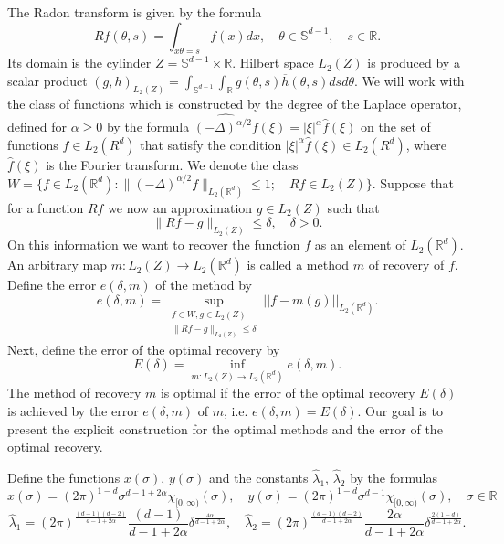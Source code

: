 \documentclass[12pt]{iopart}
\begin{document}
The Radon transform is given by the formula
	$$Rf(\theta,s)=\int_{x\theta=s}f(x)dx,\quad \theta\in\mathbb S^{d-1},\quad s\in\mathbb R.$$
Its domain is the cylinder $Z=\mathbb S^{d-1}\times\mathbb R.$ Hilbert space $L_2(Z)$ is produced by a scalar product	
	$(g,h)_{L_2(Z)}=\int_{\mathbb S^{d-1}}\int_{\mathbb R}g(\theta,s)\overline h(\theta,s)dsd\theta.$
We will work with the class of functions which is constructed by the degree of the Laplace operator, defined for $\alpha\ge 0$ by the formula $\widehat{(-\Delta)^{\alpha/2}f}(\xi)=|\xi|^\alpha \widehat f(\xi)$ on the set of functions $f\in L_2(R^d)$ that satisfy the condition $|\xi|^\alpha\widehat f(\xi)\in L_2(R^d)$, where $\widehat f(\xi)$ is the Fourier transform. We denote the class $ W=\{f\in L_2(\mathbb R^d) :
\|(-\Delta)^{\alpha/2}f\|_{L_2(\mathbb R^d)}\leqslant  1;\quad Rf\in L_2(Z) \}.  $
Suppose that for a function $Rf$ we now an approximation $g\in L_2(Z)$ such that
	$$\|Rf-g\|_{L_2(Z)}\le\delta, \quad\delta>0.$$
On this information we want to recover the function $f$ as an element of $ L_2(\mathbb R^d)$. An arbitrary map $m:L_2(Z)\rightarrow L_2(\mathbb R^d)$ is called a method $m$ of recovery of $f$. Define the error $e(\delta,m)$ of the method by
\[
  e(\delta,m)=\sup_{
  \begin{smallmatrix}
f\in W, g\in L_2(Z)\\ 
\|Rf-g\|_{L_2(Z)}\leqslant \delta
\end{smallmatrix}} ||f-m(g)||_{L_2(\mathbb R^d)}.
\] 
Next, define the error of the optimal recovery by
\begin{equation}
\label{opter}
E(\delta)=\inf_{m:L_2(Z)\rightarrow L_2(\mathbb R^d)}e(\delta,m).
\end{equation}
The method of recovery $m$ is optimal if the error of the optimal recovery $E(\delta)$ is achieved by the error $e(\delta,m)$ of $m$, i.e. $e(\delta,m)=E(\delta)$. Our goal is to present the explicit construction for the optimal methods and the error of the optimal recovery.

Define the functions $x(\sigma)$, $y(\sigma)$ and the constants $\widehat\lambda_1$, $\widehat\lambda_2$ by the formulas
  \begin{equation}
  \label{xy}
  x(\sigma)=(2\pi)^{1-d}\sigma^{d-1+2\alpha}\chi_{[0,\infty)}(\sigma),\quad
  y(\sigma)=(2\pi)^{1-d}\sigma^{d-1}\chi_{[0,\infty)}(\sigma),\quad \sigma\in\mathbb R
  \end{equation}
  \begin{equation}
    \label{lambda3.1}
    \widehat\lambda_1=(2\pi)^{\frac{(d-1)(d-2)}{d-1+2\alpha}}\frac{(d-1)}{d-1+2\alpha}\delta^\frac{4\alpha}{d-1+2\alpha},\quad \widehat\lambda_2=(2\pi)^{\frac{(d-1)(d-2)}{d-1+2\alpha}}\frac{2\alpha}{d-1+2\alpha}\delta^\frac{2(1-d)}{d-1+2\alpha}. 
  \end{equation}
\end{document}
